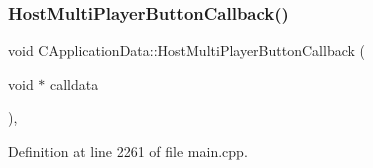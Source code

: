 \hypertarget{classCApplicationData_a9f804f7f34e1f0abf8c395cd0032d811}{}\label{classCApplicationData_a9f804f7f34e1f0abf8c395cd0032d811} 
\subsubsection{\texorpdfstring{Host\+Multi\+Player\+Button\+Callback()}{HostMultiPlayerButtonCallback()}}
{\footnotesize\ttfamily void C\+Application\+Data\+::\+Host\+Multi\+Player\+Button\+Callback (\begin{DoxyParamCaption}\item[{void $\ast$}]{calldata }\end{DoxyParamCaption})\hspace{0.3cm}{\ttfamily [static]}, {\ttfamily [protected]}}



Definition at line 2261 of file main.\+cpp.


